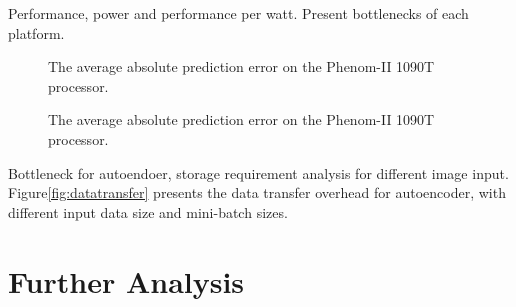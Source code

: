 \documentclass{article}
\begin{document}
Performance, power and performance per watt. Present bottlenecks of each platform.
  \begin{figure}%
            \centering
            \addtocounter{subfigure}{0}
            \vspace{0.5cm}
            \caption{The average absolute prediction error on the Phenom-II 1090T processor.}
            \label{fig:Phenom}
    \end{figure}
    
      \begin{figure}%
            \centering
            \addtocounter{subfigure}{0}
            \vspace{0.5cm}
            \caption{The average absolute prediction error on the Phenom-II 1090T processor.}
            \label{fig:Phenom}
    \end{figure}

Bottleneck for autoendoer, storage requirement analysis for different image input.
Figure\ref{fig:datatransfer} presents the data transfer overhead for autoencoder, with different input data size and mini-batch sizes.


\section{Further Analysis}
\end{document}
